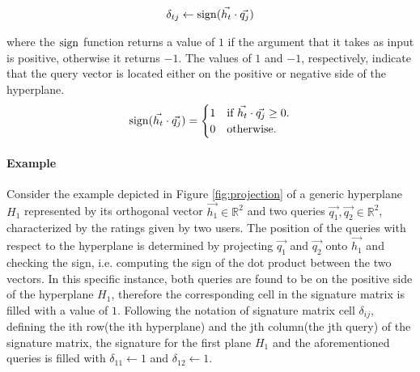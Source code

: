 \begin{equation}
\begin{aligned}
\delta_{tj} \gets \operatorname{sign}(\vec{h_t} \cdot \vec{q_j})
\end{aligned}
\end{equation}

where the $\operatorname{sign}$ function returns a value of $1$ if the argument that it takes as input is positive, otherwise it returns $-1$. The values of $1$ and $-1$, respectively, indicate that the query vector is located either on the positive or negative side of the hyperplane.
\begin{equation}
  \operatorname{sign}(\vec{h_t} \cdot \vec{q_j})=\begin{cases}
    1 & \text{if $\vec{h_t} \cdot \vec{q_j} \geq 0$}.\\
    0 & \text{otherwise}.
  \end{cases}
\label{sign_func}
\end{equation}

\paragraph{Example} Consider the example depicted in Figure \ref{fig:projection} of a generic hyperplane $H_1$ represented by its orthogonal vector $\vec{h_1} \in \mathbb{R}^2$ and two queries $\vec{q_1},\vec{q_2} \in \mathbb{R}^2$, characterized by the ratings given by two users. The position of the queries with respect to the hyperplane is determined by projecting $\vec{q_1}$ and $\vec{q_2}$ onto $\vec{h_1}$ and checking the sign, i.e. computing the sign of the dot product between the two vectors. In this specific instance, both queries are found to be on the positive side of the hyperplane $H_1$, therefore the corresponding cell in the signature matrix is filled with a value of $1$. Following the notation of signature matrix cell $\delta_{ij}$, defining the ith row(the ith hyperplane) and the jth column(the jth query) of the signature matrix, the signature for the first plane $H_1$ and the aforementioned queries is filled with $\delta_{11} \gets 1$ and $\delta_{12} \gets 1$.

